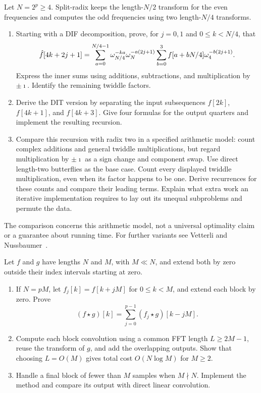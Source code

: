 \begin{exo}
\label{exo-algo-split-radix}
Let $N=2^p\geq4$. Split-radix keeps the length-$N/2$ transform for the even
frequencies and computes the odd frequencies using two length-$N/4$ transforms.
\begin{enumerate}
\item Starting with a DIF decomposition, prove, for $j=0,1$ and
$0\leq k<N/4$, that
\[
 \hat{f}[4k+2j+1]=\sum_{a=0}^{N/4-1}\omega_{N/4}^{-ka}\omega_N^{-a(2j+1)}
              \sum_{b=0}^3f[a+bN/4]\omega_4^{-b(2j+1)}.
\]
Express the inner sums using additions, subtractions, and multiplication
by $\pm\imath$. Identify the remaining twiddle factors.
\item Derive the DIT version by separating the input subsequences
$f[2k]$, $f[4k+1]$, and $f[4k+3]$. Give four formulas for the output
quarters and implement the resulting recursion.
\item Compare this recursion with radix two in a specified arithmetic model:
count complex additions and general twiddle multiplications, but regard
multiplication by $\pm\imath$ as a sign change and component swap.
Use direct length-two butterflies as the base case. Count every displayed
twiddle multiplication, even when its factor happens to be one.
Derive recurrences for these counts and compare their leading terms.
Explain what extra work an iterative implementation requires to lay out its
unequal subproblems and permute the data.
\end{enumerate}
The comparison concerns this arithmetic model, not a universal optimality
claim or a guarantee about running time. For further variants see
Vetterli and Nussbaumer~\cite{vetterli-split-radix}.
\end{exo}


\begin{exo}
\label{exo-calcul-convolution-fft}
Let $f$ and $g$ have lengths $N$ and $M$, with $M\ll N$, and extend both
by zero outside their index intervals starting at zero.
\begin{enumerate}
\item If $N=pM$, let $f_j[k]=f[k+jM]$ for $0\leq k<M$, and extend each
block by zero. Prove
\[
 (f\star g)[k]=\sum_{j=0}^{p-1}(f_j\star g)[k-jM].
\]
\item Compute each block convolution using a common FFT length
$L\geq2M-1$, reuse the transform of $g$, and add the overlapping outputs.
Show that choosing $L=O(M)$ gives total cost $O(N\log M)$ for $M\geq2$.
\item Handle a final block of fewer than $M$ samples when $M\nmid N$.
Implement the method and compare its output with direct linear convolution.
\end{enumerate}
\end{exo}

